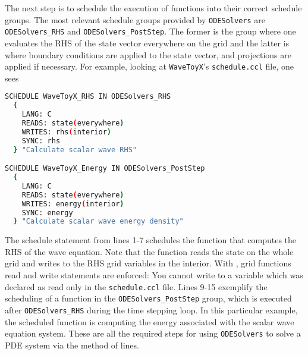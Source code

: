 The next step is to schedule the execution of functions into their correct schedule groups. The most relevant schedule groups provided by \texttt{ODESolvers} are \texttt{ODESolvers\_RHS} and \texttt{ODESolvers\_PostStep}. The former is the group where one evaluates the RHS of the state vector everywhere on the grid and the latter is where boundary conditions are applied to the state vector, and projections are applied if necessary. For example, looking at \texttt{WaveToyX}'s \texttt{schedule.ccl} file, one sees

\begin{lstlisting}[language=bash]
  SCHEDULE WaveToyX_RHS IN ODESolvers_RHS
  {
    LANG: C
    READS: state(everywhere)
    WRITES: rhs(interior)
    SYNC: rhs
  } "Calculate scalar wave RHS"

SCHEDULE WaveToyX_Energy IN ODESolvers_PostStep
  {
    LANG: C
    READS: state(everywhere)
    WRITES: energy(interior)
    SYNC: energy
  } "Calculate scalar wave energy density"
\end{lstlisting}

The schedule statement from lines 1-7 schedules the function that computes the RHS of the wave equation. Note that the function reads the state on the whole grid and writes to the RHS grid variables in the interior. With \CarpetX, grid functions read and write statements are enforced: You cannot write to a variable which was declared as read only in the \texttt{schedule.ccl} file. Lines 9-15 exemplify the scheduling of a function in the \texttt{ODESolvers\_PostStep} group, which is executed after \texttt{ODESolvers\_RHS} during the time stepping loop. In this particular example, the scheduled function is computing the energy associated with the scalar wave equation system. These are all the required steps for using \texttt{ODESolvers} to solve a PDE system via the method of lines.